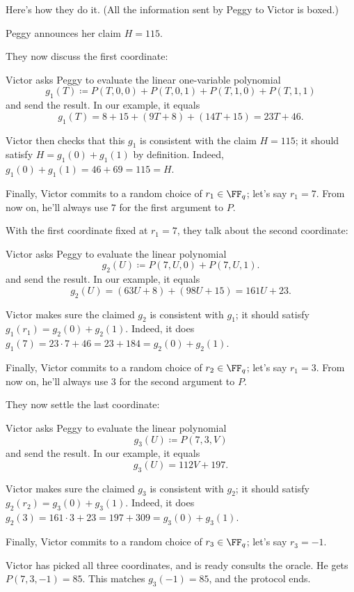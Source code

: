 \documentclass[11pt]{scrreprt}
\begin{document}
Here's how they do it.
(All the information sent by Peggy to Victor is boxed.)

\begin{enumerate}
  \ii Peggy announces her claim $\boxed{H = 115}$.

  \ii They now discuss the first coordinate:
  \begin{itemize}
    \ii Victor asks Peggy to evaluate the linear one-variable polynomial
    \[ g_1(T) \coloneqq P(T,0,0) + P(T,0,1) + P(T,1,0) + P(T,1,1) \]
    and send the result. In our example, it equals
    \[ g_1(T) = 8 + 15 + (9T+8) + (14T+15) = \boxed{23T+46}. \]

    \ii Victor then checks that this $g_1$ is consistent with the claim $H=115$;
    it should satisfy $H = g_1(0) + g_1(1)$ by definition.
    Indeed, $g_1(0)+g_1(1) = 46+69 = 115 = H$.

    \ii Finally, Victor commits to a random choice of $r_1 \in \FF_q$; let's say $r_1 = 7$.
    From now on, he'll always use $7$ for the first argument to $P$.
  \end{itemize}

  \ii With the first coordinate fixed at $r_1 = 7$, they talk about the second coordinate:
  \begin{itemize}
    \ii Victor asks Peggy to evaluate the linear polynomial
    \[ g_2(U) \coloneqq P(7,U,0) + P(7,U,1). \]
    and send the result. In our example, it equals
    \[ g_2(U) = (63U+8) + (98U+15) = \boxed{161U + 23}. \]

    \ii Victor makes sure the claimed $g_2$ is consistent with $g_1$;
    it should satisfy $g_1(r_1) = g_2(0)+g_2(1)$.
    Indeed, it does $g_1(7) = 23 \cdot 7 + 46 = 23 + 184 = g_2(0) + g_2(1)$.

    \ii Finally, Victor commits to a random choice of $r_2 \in \FF_q$; let's say $r_1 = 3$.
    From now on, he'll always use $3$ for the second argument to $P$.
  \end{itemize}

  \ii They now settle the last coordinate:
  \begin{itemize}
    \ii Victor asks Peggy to evaluate the linear polynomial
    \[ g_3(U) \coloneqq P(7,3,V) \]
    and send the result. In our example, it equals
    \[ g_3(U) = \boxed{112V+197}. \]

    \ii Victor makes sure the claimed $g_3$ is consistent with $g_2$;
    it should satisfy $g_2(r_2) = g_3(0)+g_3(1)$.
    Indeed, it does $g_2(3) = 161 \cdot 3 + 23 = 197 + 309 = g_3(0) + g_3(1)$.

    \ii Finally, Victor commits to a random choice of $r_3 \in \FF_q$; let's say $r_3 = -1$.
  \end{itemize}

  \ii Victor has picked all three coordinates, and is ready consults the oracle.
  He gets $P(7,3,-1) = 85$.
  This matches $g_3(-1) = 85$, and the protocol ends.
\end{enumerate}
\end{document}
